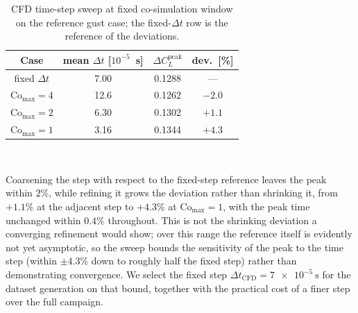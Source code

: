 \begin{table}[t]
    \centering
    \begin{tabular}{|c|c|c|c|}
    \hline
    \rowcolor{bluePoli!40}
    Case & mean $\Delta t$ [$10^{-5}$~\si{\second}] & $\Delta C_L^{\mathrm{peak}}$ & dev.\ [\%] \T\B \\
    \hline\hline
    fixed $\Delta t$ & 7.00 & 0.1288 & --- \T\B \\
    \hline
    $\mathrm{Co}_{\max}=4$   & 12.6 & 0.1262 & $-2.0$ \T\B \\
    \hline
    $\mathrm{Co}_{\max}=2$   & 6.30 & 0.1302 & $+1.1$ \T\B \\
    \hline
    $\mathrm{Co}_{\max}=1$   & 3.16 & 0.1344 & $+4.3$ \B \\
    \hline
    \end{tabular}
    \\[6pt]
    \caption{CFD time-step sweep at fixed co-simulation window on the reference gust case; the fixed-$\Delta t$ row is the reference of the deviations.}
    \label{tab:appA_courant}
\end{table}

Coarsening the step with respect to the fixed-step reference leaves the peak within $2\%$, while refining it grows the deviation rather than shrinking it, from $+1.1\%$ at the adjacent step to $+4.3\%$ at $\mathrm{Co}_{\max}=1$, with the peak time unchanged within $0.4\%$ throughout. This is not the shrinking deviation a converging refinement would show; over this range the reference itself is evidently not yet asymptotic, so the sweep bounds the sensitivity of the peak to the time step (within $\pm4.3\%$ down to roughly half the fixed step) rather than demonstrating convergence. We select the fixed step $\Delta t_{\mathrm{CFD}} = \SI{7e-5}{\second}$ for the dataset generation on that bound, together with the practical cost of a finer step over the full campaign.

